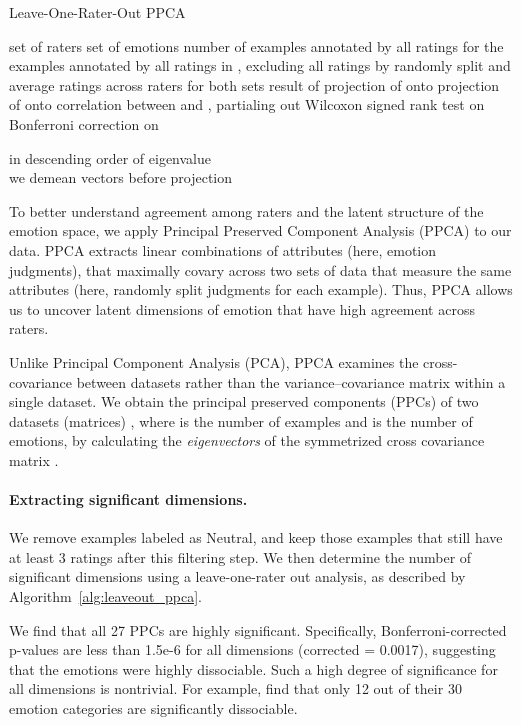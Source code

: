 \documentclass[11pt,a4paper]{article}
\begin{document}
\begin{algorithm}[]
\caption{Leave-One-Rater-Out PPCA}\label{alg:leaveout_ppca}
\begin{algorithmic}[1]
\STATE  set of raters
\STATE  set of emotions
\STATE 
{}
\STATE  number of examples annotated by  
\STATE  all ratings for the examples annotated by 
\STATE  all ratings in , excluding  
\STATE  all ratings by 
\STATE   randomly split  and average ratings across raters for both sets
\STATE   result of 
\STATE  projection of  onto 
\STATE  projection of   onto 
\STATE  correlation between  and , partialing out 
\ENDFOR
\ENDFOR
\STATE  Wilcoxon signed rank test on 
\STATE  Bonferroni correction on 
\end{algorithmic}
in descending order of eigenvalue\\
we demean vectors before projection
\end{algorithm} 


\noindent To better understand agreement among raters and the latent structure of the emotion space, we apply Principal Preserved Component Analysis (PPCA) \citep{cowen2019primacy} to our data. PPCA extracts linear combinations of attributes (here, emotion judgments), that maximally covary across two sets of data that measure the same attributes (here, randomly split judgments for each example). Thus, PPCA allows us to uncover latent dimensions of emotion that have high agreement across raters.

Unlike Principal Component Analysis (PCA), PPCA examines the cross-covariance
between datasets rather than the variance–covariance matrix
within a single dataset. We obtain the principal preserved components (PPCs) of two datasets (matrices) , where  is the number of examples and  is the number of emotions, by calculating the \emph{eigenvectors} of the symmetrized cross covariance matrix .

\paragraph{Extracting significant dimensions.} We remove examples labeled as Neutral, and keep those examples that still have at least 3 ratings after this filtering step. We then determine the number of significant dimensions using a leave-one-rater out analysis, as described by Algorithm~\ref{alg:leaveout_ppca}.

We find that all 27 PPCs are highly significant. Specifically, Bonferroni-corrected p-values are less than 1.5e-6 for all dimensions (corrected  = 0.0017), suggesting that the emotions were highly dissociable. Such a high degree of significance for all dimensions is nontrivial. For example, \citet{cowen2019primacy} find that only 12 out of their 30 emotion categories are significantly dissociable.
\end{document}
